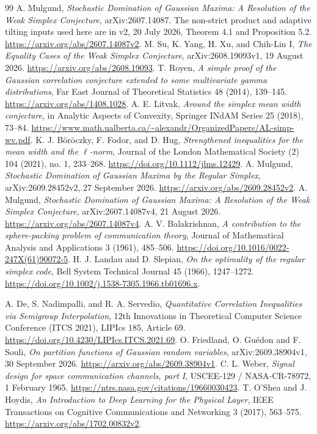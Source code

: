 \documentclass[11pt]{article}
\theoremstyle{remark}\newtheorem{remark}[theorem]{Remark}
\begin{document}
\begin{thebibliography}{99}
 A. Mulgund,
\emph{Stochastic Domination of Gaussian Maxima: A Resolution of the Weak
Simplex Conjecture}, arXiv:2607.14087. The non-strict product and adaptive
tilting inputs used here are in v2, 20 July 2026, Theorem 4.1 and Proposition 5.2.
\url{https://arxiv.org/abs/2607.14087v2}.
 M. Su, K. Yang, H. Xu, and Chih-Lin I,
\emph{The Equality Cases of the Weak Simplex Conjecture},
arXiv:2608.19093v1, 19 August 2026.
\url{https://arxiv.org/abs/2608.19093}.
 T. Royen,
\emph{A simple proof of the Gaussian correlation conjecture extended to
some multivariate gamma distributions}, Far East Journal of Theoretical
Statistics 48 (2014), 139--145. \url{https://arxiv.org/abs/1408.1028}.
 A. E. Litvak,
\emph{Around the simplex mean width conjecture}, in Analytic Aspects of
Convexity, Springer INdAM Series 25 (2018), 73--84.
\url{https://www.math.ualberta.ca/~alexandr/OrganizedPapers/AL-simp-wv.pdf}.
 K. J. B\"or\"oczky, F. Fodor, and D. Hug,
\emph{Strengthened inequalities for the mean width and the \(\ell\)-norm},
Journal of the London Mathematical Society (2) 104 (2021), no. 1, 233--268.
\url{https://doi.org/10.1112/jlms.12429}.
 A. Mulgund,
\emph{Stochastic Domination of Gaussian Maxima by the Regular Simplex},
arXiv:2609.28452v2, 27 September 2026.
\url{https://arxiv.org/abs/2609.28452v2}.
 A. Mulgund,
\emph{Stochastic Domination of Gaussian Maxima: A Resolution of the Weak
Simplex Conjecture}, arXiv:2607.14087v4, 21 August 2026.
\url{https://arxiv.org/abs/2607.14087v4}.
 A. V. Balakrishnan,
\emph{A contribution to the sphere-packing problem of communication theory},
Journal of Mathematical Analysis and Applications 3 (1961), 485--506.
\url{https://doi.org/10.1016/0022-247X(61)90072-5}.
 H. J. Landau and D. Slepian,
\emph{On the optimality of the regular simplex code},
Bell System Technical Journal 45 (1966), 1247--1272.
\url{https://doi.org/10.1002/j.1538-7305.1966.tb01696.x}.

 A. De, S. Nadimpalli, and R. A. Servedio,
\emph{Quantitative Correlation Inequalities via Semigroup Interpolation},
12th Innovations in Theoretical Computer Science Conference (ITCS 2021),
LIPIcs 185, Article 69.
\url{https://doi.org/10.4230/LIPIcs.ITCS.2021.69}.
 O. Friedland, O. Gu\'edon and F. Souli,
\emph{On partition functions of Gaussian random variables},
arXiv:2609.38904v1, 30 September 2026.
\url{https://arxiv.org/abs/2609.38904v1}.
 C. L. Weber,
\emph{Signal design for space communication channels, part I},
USCEE-129 / NASA-CR-78972, 1 February 1965.
\url{https://ntrs.nasa.gov/citations/19660030423}.
 T. O'Shea and J. Hoydis,
\emph{An Introduction to Deep Learning for the Physical Layer},
IEEE Transactions on Cognitive Communications and Networking 3 (2017),
563--575. \url{https://arxiv.org/abs/1702.00832v2}.
\end{thebibliography}
\end{document}

